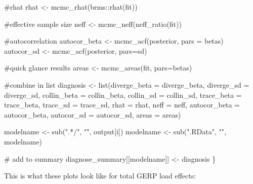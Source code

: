 \documentclass[
  letterpaper,
  DIV=11,
  numbers=noendperiod]{scrreprt}
\newenvironment{Shaded}{}{}
\newcommand{\AttributeTok}[1]{\textcolor[rgb]{0.84,0.23,0.29}{#1}}
\newcommand{\CommentTok}[1]{\textcolor[rgb]{0.42,0.45,0.49}{#1}}
\newcommand{\FunctionTok}[1]{\textcolor[rgb]{0.44,0.26,0.76}{#1}}
\newcommand{\NormalTok}[1]{\textcolor[rgb]{0.14,0.16,0.18}{#1}}
\newcommand{\OtherTok}[1]{\textcolor[rgb]{0.44,0.26,0.76}{#1}}
\newcommand{\SpecialCharTok}[1]{\textcolor[rgb]{0.00,0.36,0.77}{#1}}
\newcommand{\StringTok}[1]{\textcolor[rgb]{0.01,0.18,0.38}{#1}}
\begin{document}
\begin{Shaded}
\begin{Highlighting}[]
  \CommentTok{\#rhat}
\NormalTok{  rhat }\OtherTok{\textless{}{-}} \FunctionTok{mcmc\_rhat}\NormalTok{(brms}\SpecialCharTok{::}\FunctionTok{rhat}\NormalTok{(fit))}
  
  \CommentTok{\#effective sample size}
\NormalTok{  neff }\OtherTok{\textless{}{-}} \FunctionTok{mcmc\_neff}\NormalTok{(}\FunctionTok{neff\_ratio}\NormalTok{(fit))}
  
  \CommentTok{\#autocorrelation}
\NormalTok{  autocor\_beta }\OtherTok{\textless{}{-}} \FunctionTok{mcmc\_acf}\NormalTok{(posterior, }\AttributeTok{pars =}\NormalTok{ betas)}
\NormalTok{  autocor\_sd }\OtherTok{\textless{}{-}} \FunctionTok{mcmc\_acf}\NormalTok{(posterior, }\AttributeTok{pars=}\NormalTok{sd)}
  
  \CommentTok{\#quick glance results}
\NormalTok{  areas }\OtherTok{\textless{}{-}} \FunctionTok{mcmc\_areas}\NormalTok{(fit, }\AttributeTok{pars=}\NormalTok{betas)}
  
  \CommentTok{\#combine in list}
\NormalTok{  diagnosis }\OtherTok{\textless{}{-}} \FunctionTok{list}\NormalTok{(}\AttributeTok{diverge\_beta =}\NormalTok{ diverge\_beta, }
                    \AttributeTok{diverge\_sd =}\NormalTok{ diverge\_sd, }
                    \AttributeTok{collin\_beta =}\NormalTok{ collin\_beta, }
                    \AttributeTok{collin\_sd =}\NormalTok{ collin\_sd, }
                    \AttributeTok{trace\_beta =}\NormalTok{ trace\_beta, }
                    \AttributeTok{trace\_sd =}\NormalTok{ trace\_sd, }
                    \AttributeTok{rhat =}\NormalTok{ rhat, }
                    \AttributeTok{neff =}\NormalTok{ neff, }
                    \AttributeTok{autocor\_beta =}\NormalTok{ autocor\_beta, }
                    \AttributeTok{autocor\_sd =}\NormalTok{ autocor\_sd,}
                    \AttributeTok{areas =}\NormalTok{ areas)}
  
  
\NormalTok{  modelname }\OtherTok{\textless{}{-}} \FunctionTok{sub}\NormalTok{(}\StringTok{".*/"}\NormalTok{, }\StringTok{""}\NormalTok{, output[i]) }
\NormalTok{  modelname }\OtherTok{\textless{}{-}} \FunctionTok{sub}\NormalTok{(}\StringTok{".RData"}\NormalTok{, }\StringTok{""}\NormalTok{, modelname)}
  
  \CommentTok{\# add to summary}
\NormalTok{  diagnose\_summary[[modelname]] }\OtherTok{\textless{}{-}}\NormalTok{ diagnosis}
\NormalTok{\}}
\end{Highlighting}
\end{Shaded}

This is what these plots look like for total GERP load effects:
\end{document}
